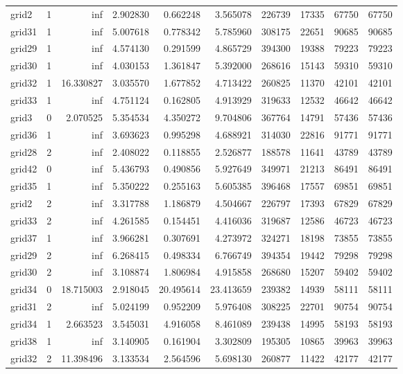 \begin{longtable}{|l|r|r|r|r|r|r|r|r|r|}
grid2 & 1 & inf & 2.902830 & 0.662248 & 3.565078 & 226739 & 17335 & 67750 & 67750 \\
grid31 & 1 & inf & 5.007618 & 0.778342 & 5.785960 & 308175 & 22651 & 90685 & 90685 \\
grid29 & 1 & inf & 4.574130 & 0.291599 & 4.865729 & 394300 & 19388 & 79223 & 79223 \\
grid30 & 1 & inf & 4.030153 & 1.361847 & 5.392000 & 268616 & 15143 & 59310 & 59310 \\
grid32 & 1 & 16.330827 & 3.035570 & 1.677852 & 4.713422 & 260825 & 11370 & 42101 & 42101 \\
grid33 & 1 & inf & 4.751124 & 0.162805 & 4.913929 & 319633 & 12532 & 46642 & 46642 \\
grid3 & 0 & 2.070525 & 5.354534 & 4.350272 & 9.704806 & 367764 & 14791 & 57436 & 57436 \\
grid36 & 1 & inf & 3.693623 & 0.995298 & 4.688921 & 314030 & 22816 & 91771 & 91771 \\
grid28 & 2 & inf & 2.408022 & 0.118855 & 2.526877 & 188578 & 11641 & 43789 & 43789 \\
grid42 & 0 & inf & 5.436793 & 0.490856 & 5.927649 & 349971 & 21213 & 86491 & 86491 \\
grid35 & 1 & inf & 5.350222 & 0.255163 & 5.605385 & 396468 & 17557 & 69851 & 69851 \\
grid2 & 2 & inf & 3.317788 & 1.186879 & 4.504667 & 226797 & 17393 & 67829 & 67829 \\
grid33 & 2 & inf & 4.261585 & 0.154451 & 4.416036 & 319687 & 12586 & 46723 & 46723 \\
grid37 & 1 & inf & 3.966281 & 0.307691 & 4.273972 & 324271 & 18198 & 73855 & 73855 \\
grid29 & 2 & inf & 6.268415 & 0.498334 & 6.766749 & 394354 & 19442 & 79298 & 79298 \\
grid30 & 2 & inf & 3.108874 & 1.806984 & 4.915858 & 268680 & 15207 & 59402 & 59402 \\
grid34 & 0 & 18.715003 & 2.918045 & 20.495614 & 23.413659 & 239382 & 14939 & 58111 & 58111 \\
grid31 & 2 & inf & 5.024199 & 0.952209 & 5.976408 & 308225 & 22701 & 90754 & 90754 \\
grid34 & 1 & 2.663523 & 3.545031 & 4.916058 & 8.461089 & 239438 & 14995 & 58193 & 58193 \\
grid38 & 1 & inf & 3.140905 & 0.161904 & 3.302809 & 195305 & 10865 & 39963 & 39963 \\
grid32 & 2 & 11.398496 & 3.133534 & 2.564596 & 5.698130 & 260877 & 11422 & 42177 & 42177 \\

\end{longtable}

